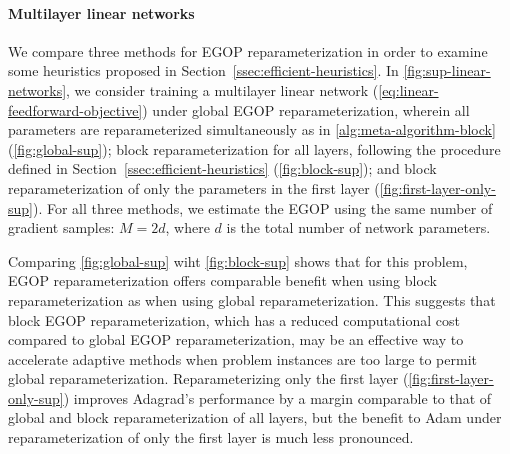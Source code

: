 \paragraph{Multilayer linear networks} We compare three methods for EGOP reparameterization in order to examine some heuristics proposed in Section~\ref{ssec:efficient-heuristics}. In \cref{fig:sup-linear-networks}, we consider training a multilayer linear network (\ref{eq:linear-feedforward-objective}) under  global EGOP reparameterization, wherein all parameters are reparameterized simultaneously as in \cref{alg:meta-algorithm-block} (\cref{fig:global-sup});  block reparameterization for all layers, following the procedure defined in Section~\ref{ssec:efficient-heuristics} (\cref{fig:block-sup}); and block reparameterization of only the parameters in the first layer (\cref{fig:first-layer-only-sup}). For all three methods, we estimate the EGOP using the same number of gradient samples: $M = 2d$, where $d$ is the total number of network parameters.

Comparing \cref{fig:global-sup} wiht \cref{fig:block-sup} shows that for this problem, EGOP reparameterization offers comparable benefit when using block reparameterization as when using global reparameterization. This suggests that block EGOP reparameterization, which has a reduced computational cost compared to global EGOP reparameterization, may be an effective way to accelerate adaptive methods when problem instances are too large to permit global reparameterization. Reparameterizing only the first layer (\cref{fig:first-layer-only-sup}) improves Adagrad's performance by a margin comparable to that of global and block reparameterization of all layers, but the benefit to Adam under reparameterization of only the first layer is much less pronounced.



